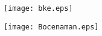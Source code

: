 \begin{scheme}[H]
	\begin{center}
		\texttt{[image: bke.eps]}
	\end{center}
\end{scheme}

\begin{scheme}[H]
	\begin{center}
		\texttt{[image: Bocenaman.eps]}
	\end{center}
\end{scheme}
